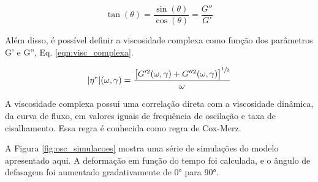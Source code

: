 			\begin{equation}
				\tan(\theta) = \dfrac{\sin(\theta)}{\cos(\theta)} = \dfrac{G''}{G'}
				\label{eqn:osc_tan_teta}
			\end{equation}
			
			Além disso, é possível definir a viscosidade complexa como função dos parâmetros G' e G'', Eq. \ref{eqn:visc_complexa}.
			
			\begin{equation}
				| \eta^* |(\omega, \gamma) = \dfrac{\left[ G'^2(\omega, \gamma) + G''^2(\omega, \gamma) \right] ^ {\sfrac{1}{2}}} {\omega}
				\label{eqn:visc_complexa}
			\end{equation}  %
			
			A viscosidade complexa possui uma correlação direta com a viscosidade dinâmica, da curva de fluxo, em valores iguais de frequência de oscilação e taxa de cisalhamento. Essa regra é conhecida como regra de Cox-Merz. %
			
			A Figura \ref{fig:osc_simulacoes} mostra uma série de simulações do modelo apresentado aqui. A deformação em função do tempo foi calculada, e o ângulo de defasagem foi aumentado gradativamente de 0° para 90°. 

